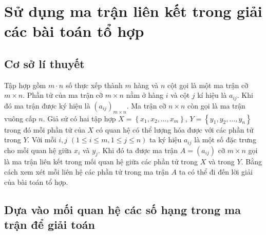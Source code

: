 \section{Sử dụng ma trận liên kết trong giải các bài toán tổ hợp}
\setcounter{bt}{0}
\subsection{Cơ sở lí thuyết}
Tập hợp gồm $m\cdot n$ số thực xếp thành $m$ hàng và $n$ cột gọi là một ma trận cỡ $m \times n$. Phần tử của ma trận cỡ $m \times n$ nằm ở hàng $i$ và cột $j$ kí hiệu là $a_{ij}$. Khi đó ma trận được ký hiệu là $(a_{ij})_{m\times n}$. Ma trận cỡ $n \times n$ còn gọi là ma trận vuông cấp $n$. Giả sử có hai tập hợp $X=\left\{x_1, x_2,\ldots,x_m \right\}$, $Y=\left\{y_1, y_2,\ldots,y_n \right\}$ trong đó mỗi phần tử của $X$ có quan hệ  có thể lượng hóa được với các phần tử trong $Y$. Với mỗi $i,j$ $(1\le i \le m, 1 \le j \le n)$ ta ký hiệu $a_{ij}$ là một số đặc trưng cho mỗi quan hệ giữa $x_i$ và $y_j$. Khi đó ta được ma trận $A=(a_{ij})$ cỡ $m \times n$ gọi là ma trận liên kết trong mối quan hệ giữa các phần tử trong $X$ và trong $Y$. Bằng cách xem xét mỗi liên hệ các phần tử trong ma trận $A$ ta có thể đi đến lời giải của bài toán tổ hợp. 

\subsection{Dựa vào mối quan hệ	các số hạng trong ma trận để giải toán}

